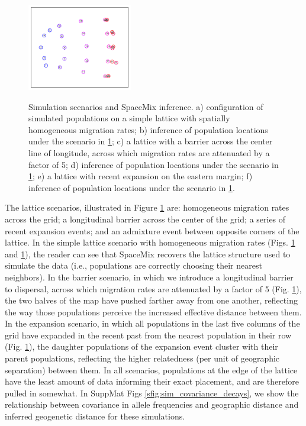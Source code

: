 \documentclass[12pt]{article}
\begin{document}
\begin{figure}
			{\includegraphics[width=1.8in,height=1.5in]{figs/sims/GeoGenMap_expansion.pdf}}

	\caption{Simulation scenarios and SpaceMix inference.  a) configuration of simulated populations on a simple lattice with spatially homogeneous migration rates; b) inference of population locations under the scenario in \ref{sfig:lattice_scenarios};  c) a lattice with a barrier across the center line of longitude, across which migration rates are attenuated by a factor of 5; d) inference of population locations under the scenario in \ref{sfig:lattice_scenarios}; e) a lattice with recent expansion on the eastern margin; f) inference of population locations under the scenario in \ref{sfig:lattice_scenarios}.}\label{sfig:lattice_scenarios}
\end{figure}

The lattice scenarios, illustrated in Figure \ref{sfig:lattice_scenarios} are: homogeneous migration rates across the grid; a longitudinal barrier across the center of the grid; a series of recent expansion events; and an admixture event between opposite corners of the lattice.  In the simple lattice scenario with homogeneous migration rates (Figs. \ref{sfig:lattice_scenarios} and \ref{sfig:lattice_scenarios}), the reader can see that SpaceMix recovers the lattice structure used to simulate the data (i.e., populations are correctly choosing their nearest neighbors).  In the barrier scenario, in which we introduce a longitudinal barrier to dispersal, across which migration rates are attenuated by a factor of 5 (Fig. \ref{sfig:lattice_scenarios}), the two halves of the map have pushed farther away from one another, reflecting the way those populations perceive the increased effective distance between them.  In the expansion scenario, in which all populations in the last five columns of the grid have expanded in the recent past from the nearest population in their row (Fig. \ref{sfig:lattice_scenarios}), the daughter populations of the expansion event cluster with their parent populations, reflecting the higher relatedness (per unit of geographic separation) between them.  In all scenarios, populations at the edge of the lattice have the least amount of data informing their exact placement, and are therefore pulled in somewhat.  In SuppMat Figs \ref{sfig:sim_covariance_decays}, we show the relationship between covariance in allele frequencies and geographic distance and inferred geogenetic distance for these simulations.
\end{document}
